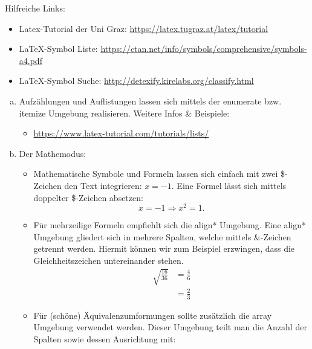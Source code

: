 

Hilfreiche Links:
\begin{itemize}
    \item Latex-Tutorial der Uni Graz: 
    \url{https://latex.tugraz.at/latex/tutorial}
    \item LaTeX-Symbol Liste: \url{https://ctan.net/info/symbols/comprehensive/symbols-a4.pdf}
    \item LaTeX-Symbol Suche: \url{http://detexify.kirelabs.org/classify.html}
\end{itemize}

\begin{enumerate}[a)] %
\item Aufzählungen und Auflistungen lassen sich mittels der enumerate bzw. itemize Umgebung realisieren. Weitere Infos \& Beispiele: 
\begin{itemize}
\item \url{https://www.latex-tutorial.com/tutorials/lists/}
\end{itemize}
\item Der Mathemodus:
\begin{itemize} \item Mathematische Symbole und Formeln lassen sich einfach mit zwei \$-Zeichen den Text integrieren: $x = -1$. Eine Formel lässt sich mittels doppelter \$-Zeichen absetzen: $$ x = -1 \Rightarrow x^2 = 1.$$
    \item Für mehrzeilige Formeln empfiehlt sich die align* Umgebung. Eine align* Umgebung gliedert sich in mehrere Spalten, welche mittels \&-Zeichen getrennt werden. Hiermit können wir zum Beispiel erzwingen, dass die Gleichheitszeichen untereinander stehen.
  \begin{align*}
      \sqrt{\frac{16}{36}} &= \frac{4}{6}  \\
     &= \frac{2}{3}
  \end{align*}
  \item 
 Für (schöne) Äquivalenzumformungen sollte zusätzlich die array Umgebung verwendet werden. Dieser Umgebung teilt man die Anzahl der Spalten sowie dessen Ausrichtung  mit:
    \begin{align*}
        \begin{array}{lrcl} %

\end{array}
\end{align*}
\end{itemize}
\end{enumerate}
